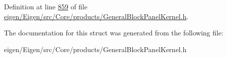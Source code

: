 Definition at line \hyperlink{eigen_2_eigen_2src_2_core_2products_2_general_block_panel_kernel_8h_source_l00859}{859} of file \hyperlink{eigen_2_eigen_2src_2_core_2products_2_general_block_panel_kernel_8h_source}{eigen/\+Eigen/src/\+Core/products/\+General\+Block\+Panel\+Kernel.\+h}.



The documentation for this struct was generated from the following file\+:\begin{DoxyCompactItemize}
\item 
eigen/\+Eigen/src/\+Core/products/\+General\+Block\+Panel\+Kernel.\+h\end{DoxyCompactItemize}
